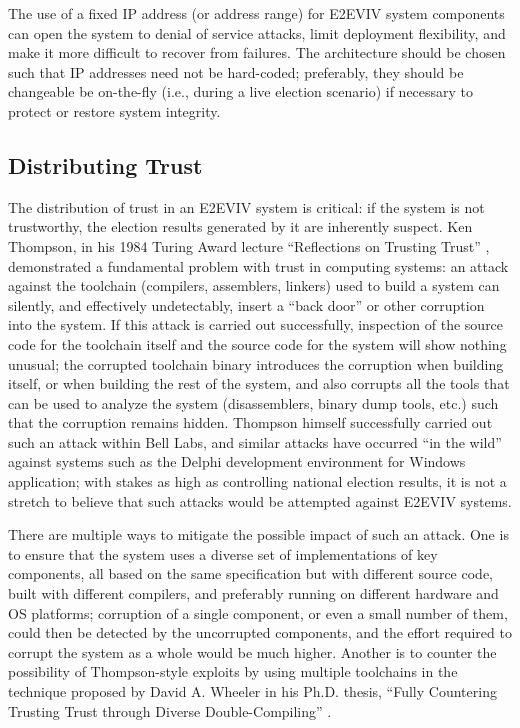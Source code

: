 The use of a fixed IP address (or address range) for E2EVIV system
components can open the system to denial of service attacks, limit
deployment flexibility, and make it more difficult to recover from
failures. The architecture should be chosen such that IP addresses
need not be hard-coded; preferably, they should be changeable be
on-the-fly (i.e., during a live election scenario) if necessary to
protect or restore system integrity.




\subsection{Distributing Trust}

The distribution of trust in an E2EVIV system is critical: if the
system is not trustworthy, the election results generated by it are
inherently suspect. Ken Thompson, in his 1984 Turing Award lecture
``Reflections on Trusting Trust'' \cite{Thompson84}, demonstrated a
fundamental problem with trust in computing systems: an attack against
the toolchain (compilers, assemblers, linkers) used to build a system
can silently, and effectively undetectably, insert a ``back door'' or
other corruption into the system. If this attack is carried out
successfully, inspection of the source code for the toolchain itself
and the source code for the system will show nothing unusual; the
corrupted toolchain binary introduces the corruption when building
itself, or when building the rest of the system, and also corrupts all
the tools that can be used to analyze the system (disassemblers,
binary dump tools, etc.) such that the corruption remains
hidden. Thompson himself successfully carried out such an attack
within Bell Labs, and similar attacks have occurred ``in the wild''
against systems such as the Delphi development environment for Windows
application; with stakes as high as controlling national election
results, it is not a stretch to believe that such attacks would be
attempted against E2EVIV systems.

There are multiple ways to mitigate the possible impact of such an
attack. One is to ensure that the system uses a diverse set of
implementations of key components, all based on the same specification
but with different source code, built with different compilers, and
preferably running on different hardware and OS platforms; corruption
of a single component, or even a small number of them, could then be
detected by the uncorrupted components, and the effort required to
corrupt the system as a whole would be much higher. Another is to
counter the possibility of Thompson-style exploits by using multiple
toolchains in the technique proposed by David A. Wheeler in his
Ph.D. thesis, ``Fully Countering Trusting Trust through Diverse
Double-Compiling'' \cite{Wheeler09}.

